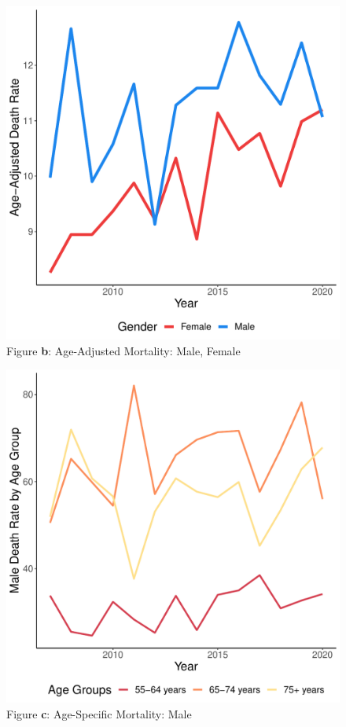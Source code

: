 \documentclass[12pt]{article}
\begin{document}
\begin{figure}
    \centering
    \includegraphics[scale=0.5]{analysis/output/age_adj_deaths_by_gender_plot.pdf}
    \caption{Figure \textbf{b}: Age-Adjusted Mortality: Male, Female}
    \label{fig:age_adj_deaths_by_gender}
\end{figure}


\begin{figure}
    \centering
    \includegraphics[scale=0.5]{analysis/output/male_age_specific_deaths_plot.pdf}
    \caption{Figure \textbf{c}: Age-Specific Mortality: Male}
    \label{fig:male_age_specific_deaths}
\end{figure}
\end{document}
